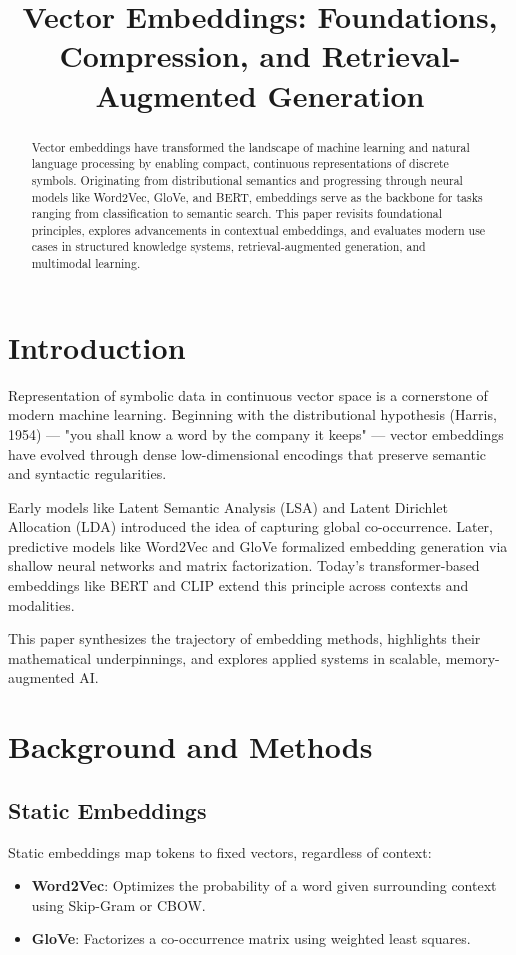 \documentclass{article}
\title{Vector Embeddings: Foundations, Compression, and Retrieval-Augmented Generation}
\author{}
\date{}
\begin{document}
\maketitle

\begin{abstract}
Vector embeddings have transformed the landscape of machine learning and natural language processing by enabling compact, continuous representations of discrete symbols. Originating from distributional semantics and progressing through neural models like Word2Vec, GloVe, and BERT, embeddings serve as the backbone for tasks ranging from classification to semantic search. This paper revisits foundational principles, explores advancements in contextual embeddings, and evaluates modern use cases in structured knowledge systems, retrieval-augmented generation, and multimodal learning.
\end{abstract}

\section{Introduction}
Representation of symbolic data in continuous vector space is a cornerstone of modern machine learning. Beginning with the distributional hypothesis (Harris, 1954) --- "you shall know a word by the company it keeps" --- vector embeddings have evolved through dense low-dimensional encodings that preserve semantic and syntactic regularities.

Early models like Latent Semantic Analysis (LSA) and Latent Dirichlet Allocation (LDA) introduced the idea of capturing global co-occurrence. Later, predictive models like Word2Vec and GloVe formalized embedding generation via shallow neural networks and matrix factorization. Today’s transformer-based embeddings like BERT and CLIP extend this principle across contexts and modalities.

This paper synthesizes the trajectory of embedding methods, highlights their mathematical underpinnings, and explores applied systems in scalable, memory-augmented AI.

\section{Background and Methods}

\subsection{Static Embeddings}
Static embeddings map tokens to fixed vectors, regardless of context:
\begin{itemize}
  \item \textbf{Word2Vec}: Optimizes the probability of a word given surrounding context using Skip-Gram or CBOW.
  \item \textbf{GloVe}: Factorizes a co-occurrence matrix using weighted least squares.
\end{itemize}
\end{document}
